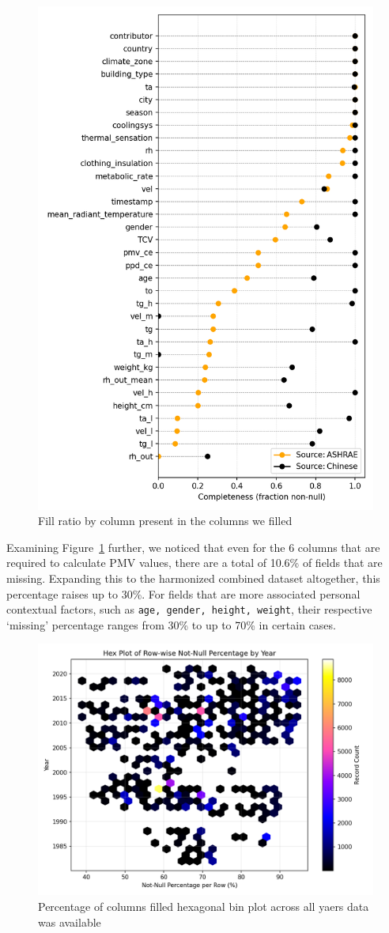 \begin{figure}[h!]
    \centering
    \includegraphics[width=0.5\linewidth]{fig/completeness.png}
    \caption{Fill ratio by column present in the columns we filled}
    \label{fig:completeness}
\end{figure}

Examining Figure~\ref{fig:completeness} further, we noticed that even for the 6 columns that are required to calculate PMV values, there are a total of 10.6\% of fields that are missing. Expanding this to the harmonized combined dataset altogether, this percentage raises up to 30\%. For fields that are more associated personal contextual factors, such as \texttt{age, gender, height, weight}, their respective `missing' percentage ranges from 30\% to up to 70\% in certain cases. 

\begin{figure}[h!]
    \centering
    \includegraphics[width=0.75\linewidth]{fig/hex_fill.png}
    \caption{Percentage of columns filled hexagonal bin plot across all yaers data was available}
    \label{fig:hexmap}
\end{figure}

